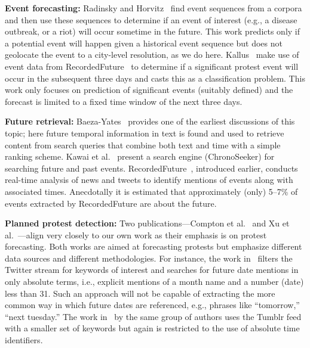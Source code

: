 \documentclass[letterpaper]{article}
\begin{document}
{\bf Event forecasting:} 
Radinsky and Horvitz~ find event sequences
from a corpora and then use these sequences to determine if an event of
interest (e.g., a disease outbreak, or a riot) will occur sometime in
the future. This work predicts only if a potential event will happen
given a historical event sequence but does not geolocate the event to a
city-level resolution, as we do here.  Kallus~
make use of event data from RecordedFuture~\cite{recordedFuture} to
determine if a  significant protest event will occur in the subsequent
three days and casts this as a classification problem.  This work only
focuses on prediction of significant events (suitably defined) and the
forecast is limited to a fixed time window of the next three days. 

{\bf Future retrieval:}
Baeza-Yates~ provides one of the earliest
discussions of this topic; here future temporal information in text is
found and used to retrieve content from search queries that combine both
text and time with a simple ranking scheme.  Kawai et
al.~ present a search engine (ChronoSeeker)
for searching future and past events.
RecordedFuture~\cite{recordedFuture}, introduced earlier, conducts
real-time analysis of news and tweets to identify mentions of events
along with associated times. Anecdotally it is estimated that
approximately (only) 5--7\% of events extracted by RecordedFuture are
about the future.

{\bf Planned protest detection:}
Two publications---Compton et al.~ and
Xu et al.~---align very closely to our own work
as their emphasis is on protest forecasting.  Both works are aimed at
forecasting protests but emphasize different data sources and different
methodologies. For instance, the work in~\cite{compton2013detecting}
filters the Twitter stream for keywords of interest and searches for
future date mentions in only absolute terms, i.e., explicit mentions of
a month name and a number (date) less than 31.  Such an approach will
not be capable of extracting the more common way in which future dates
are referenced, e.g., phrases like ``tomorrow,'' ``next tuesday.'' The
work in~\cite{xu2014civil} by the same group of authors uses the Tumblr
feed with a smaller set of keywords but again is restricted to the use
of absolute time identifiers.
\end{document}

